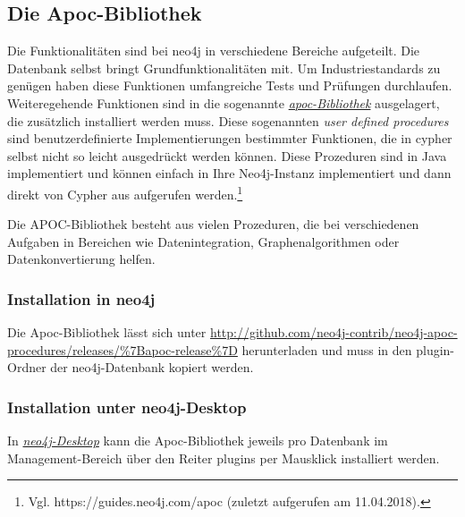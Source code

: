 \documentclass[12pt,ngerman,]{article}
\begin{document}
\subsection{Die Apoc-Bibliothek}\label{die-apoc-bibliothek}

Die Funktionalitäten sind bei neo4j in verschiedene Bereiche aufgeteilt.
Die Datenbank selbst bringt Grundfunktionalitäten mit. Um
Industriestandards zu genügen haben diese Funktionen umfangreiche Tests
und Prüfungen durchlaufen. Weiteregehende Funktionen sind in die
sogenannte \href{https://guides.neo4j.com/apoc}{\emph{apoc-Bibliothek}}
ausgelagert, die zusätzlich installiert werden muss. Diese sogenannten
\emph{user defined procedures} sind benutzerdefinierte Implementierungen
bestimmter Funktionen, die in cypher selbst nicht so leicht ausgedrückt
werden können. Diese Prozeduren sind in Java implementiert und können
einfach in Ihre Neo4j-Instanz implementiert und dann direkt von Cypher
aus aufgerufen werden.\footnote{Vgl. https://guides.neo4j.com/apoc
  (zuletzt aufgerufen am 11.04.2018).}

Die APOC-Bibliothek besteht aus vielen Prozeduren, die bei verschiedenen
Aufgaben in Bereichen wie Datenintegration, Graphenalgorithmen oder
Datenkonvertierung helfen.

\subsubsection{Installation in neo4j}\label{installation-in-neo4j}

Die Apoc-Bibliothek lässt sich unter
\url{http://github.com/neo4j-contrib/neo4j-apoc-procedures/releases/\%7Bapoc-release\%7D}
herunterladen und muss in den plugin-Ordner der neo4j-Datenbank kopiert
werden.

\subsubsection{Installation unter
neo4j-Desktop}\label{installation-unter-neo4j-desktop}

In \href{https://neo4j.com/download/}{\emph{neo4j-Desktop}} kann die
Apoc-Bibliothek jeweils pro Datenbank im Management-Bereich über den
Reiter plugins per Mausklick installiert werden.
\end{document}

